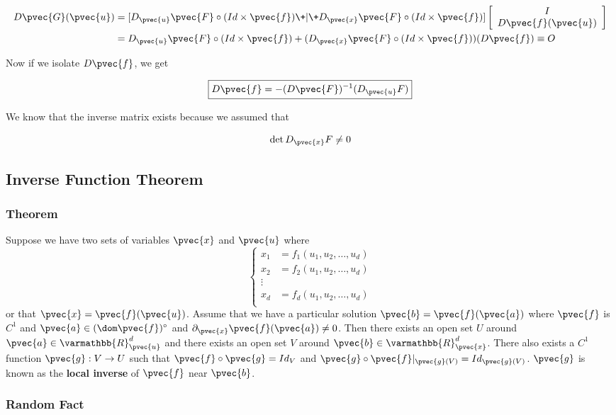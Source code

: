 \documentclass[11 pt, twoside]{article}
\begin{document}
\begin{align*}
D\pvec{G}(\pvec{u}) &= [D_{\pvec{u}} \pvec{F} \circ (Id \times \pvec{f}) \+|\+
D_{\pvec{x}} \pvec{F} \circ (Id \times \pvec{f})]\left[\begin{array}{c}
I \\
D\pvec{f} (\pvec{u})\\
\end{array}\right]\\
&= D_{\pvec{u}} \pvec{F} \circ (Id \times \pvec{f}) + (D_{\pvec{x}}
\pvec{F} \circ (Id \times \pvec{f}))(D\pvec{f}) \equiv O
\end{align*}

Now if we isolate $D\pvec{f}$, we get

\[
\boxed{D\pvec{f} = - (D\pvec{F})^{-1} (D_{\pvec{u}} F)}
\]

We know that the inverse matrix exists because we assumed that

$$\det D_{\pvec{x}} F \neq 0$$

\subsection{Inverse Function Theorem}
\subsubsection{Theorem}
Suppose we have two sets of variables $\pvec{x}$ and $\pvec{u}$ where
\[
\begin{cases}
x_1 &= f_1 (u_1, u_2, \dots, u_d) \\
x_2 &= f_2 (u_1, u_2, \dots, u_d) \\
\vdots & \\
x_d &= f_d (u_1, u_2, \dots, u_d)\\
\end{cases}
\]
or that $\pvec{x} = \pvec{f}(\pvec{u})$. Assume that we have a particular solution
$\pvec{b} = \pvec{f}(\pvec{a})$ where $\pvec{f}$ is $C^1$ and $\pvec{a} \in (\dom
\pvec{f})^\circ$ and $\partial_{\pvec{x}} \pvec{f}(\pvec{a}) \neq 0$. Then there exists an open set $U$ around $\pvec{a} \in
\varmathbb{R}^d_{\pvec{u}}$ and there exists an open set $V$ around $\pvec{b} \in
\varmathbb{R}^d_{\pvec{x}}$. There also exists a $C^1$ function $\pvec{g}: V \to
U$ such that $\pvec{f} \circ \pvec{g} = Id_V$ and $\pvec{g} \circ
\pvec{f}|_{\pvec{g}(V)} = Id_{\pvec{g}(V)}$. $\pvec{g}$ is known as the \textbf{local inverse}
of $\pvec{f}$ near $\pvec{b}$.

\subsubsection{Random Fact}
\end{document}
